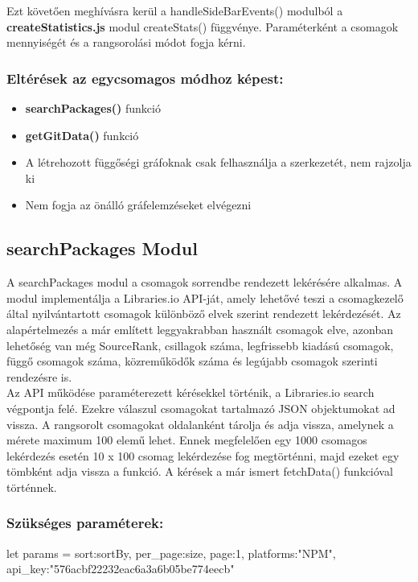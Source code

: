 Ezt követően meghívásra kerül a handleSideBarEvents() modulból a \textbf{createStatistics.js} modul createStats() függvénye. Paraméterként a csomagok mennyiségét és a rangsorolási módot fogja kérni.

\subsubsection{Eltérések az egycsomagos módhoz képest:}

\begin{itemize}
	\item \textbf{searchPackages()} funkció
	\item \textbf{getGitData()} funkció
	\item A létrehozott függőségi gráfoknak csak felhasználja a szerkezetét, nem rajzolja ki
	\item Nem fogja az önálló gráfelemzéseket elvégezni
\end{itemize}

\subsection{searchPackages Modul}

A searchPackages modul a csomagok sorrendbe rendezett lekérésére alkalmas. A modul implementálja a Libraries.io API-ját, amely lehetővé teszi a csomagkezelő által nyilvántartott csomagok különböző elvek szerint rendezett lekérdezését. Az alapértelmezés a már említett leggyakrabban használt csomagok elve, azonban lehetőség van még SourceRank, csillagok száma, legfrissebb kiadású csomagok, függő csomagok száma, közreműködők száma és legújabb csomagok szerinti rendezésre is.\\

Az API működése paraméterezett kérésekkel történik, a Libraries.io search végpontja felé. Ezekre válaszul csomagokat tartalmazó JSON objektumokat ad vissza. A rangsorolt csomagokat oldalanként tárolja és adja vissza, amelynek a mérete maximum 100 elemű lehet. Ennek megfelelően egy 1000 csomagos lekérdezés esetén 10 x 100 csomag lekérdezése fog megtörténni, majd ezeket egy tömbként adja vissza a funkció. A kérések a már ismert fetchData() funkcióval történnek.

\subsubsection{Szükséges paraméterek:}
\begin{js}
	let params = {
		sort:sortBy, 
		per_page:size,
		page:1,
		platforms:"NPM",
		api_key:"576acbf22232eac6a3a6b05be774eecb"
	}
\end{js}

